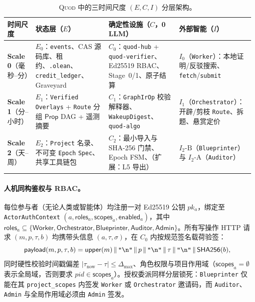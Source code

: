 \documentclass[10pt,a4paper,fontset=fandol]{ctexart}
\newcommand{\Prop}{\mathsf{Prop}}
\newcommand{\kw}[1]{\mathsf{#1}}
\newcommand{\code}[1]{\texttt{#1}}
\begin{document}
\begin{table}[t]
\centering
\caption{\textsc{Quod} 中的三时间尺度 $(E, C, I)$ 分层架构。}
\label{tab:eci}
\small
\begin{tabular}{@{}lp{3.7cm}p{4.1cm}p{3.6cm}@{}}
\toprule
\textbf{时间尺度} & \textbf{状态层（$E$）} & \textbf{确定性设施（$C$，0 LLM）} & \textbf{外部智能（$I$）} \\
\midrule
\textbf{Scale 0}（毫秒--分） &
$E_0$：\code{events}、CAS 源码库、租约、\code{.olean}、\code{credit\_ledger}、Graveyard &
$C_0$：\code{quod-hub} + \code{quod-verifier}、Ed25519 RBAC、Stage~0/1、原子结算 &
$I_0$（\code{Worker}）：本地证明/反驳搜索、\code{fetch}/\code{submit} \\
\addlinespace
\textbf{Scale 1}（分--小时） &
$E_1$：\code{Verified Overlays} + \code{Route} 分组 $\Prop$ DAG + 遥测摘要 &
$C_1$：\code{GraphIrOp} 校验解释器、\code{WakeupDigest}、\code{quod-algo} &
$I_1$（\code{Orchestrator}）：开辟/剪枝 \code{Route}、拆题、悬赏定价 \\
\addlinespace
\textbf{Scale 2}（天--周） &
$E_2$：\code{Project} 名录、不可变 \code{Epoch} \code{Spec}、共享工具链包 &
$C_2$：最小导入与 SHA-256 门禁、Epoch FSM、（扩展：L5 导出） &
$I_2\text{-B}$（\code{Blueprinter}）与 $I_2\text{-A}$（\code{Auditor}） \\
\bottomrule
\end{tabular}
\end{table}

\paragraph{人机同构鉴权与 RBAC。}
每位参与者（无论人类或智能体）均注册一对 Ed25519 公钥 $pk_a$，绑定至 \code{ActorAuthContext} $(a, \kw{roles}_a, \kw{scopes}_a, \kw{enabled}_a)$，其中 $\kw{roles}_a \subseteq \{\kw{Worker}, \kw{Orchestrator}, \kw{Blueprinter}, \kw{Auditor}, \kw{Admin}\}$。所有写操作 HTTP 请求 $(m, p, \tau, b)$ 均携带头信息 $(a, \tau, \sigma)$，在 $C_0$ 内按规范签名载荷验签：
\[
\kw{payload}(m, p, \tau, b) = \kw{upper}(m) \,\|\, \text{\code{"\textbackslash n"}} \,\|\, p \,\|\, \text{\code{"\textbackslash n"}} \,\|\, \tau \,\|\, \text{\code{"\textbackslash n"}} \,\|\, \kw{SHA256}(b),
\]
同时硬性校验时间戳偏差 $|\tau_{\mathrm{now}} - \tau| \le \Delta_{\max}$、角色权限与项目作用域（$\kw{scopes}_a = \emptyset$ 表示全局域，否则要求 $pid \in \kw{scopes}_a$）。授权委派同样分层锁死：\code{Blueprinter} 仅能在其 \code{project\_scopes} 内签发 \code{Worker} 或 \code{Orchestrator} 邀请码，而 \code{Auditor}、\code{Admin} 与全局作用域必须由 \code{Admin} 签发。
\end{document}
